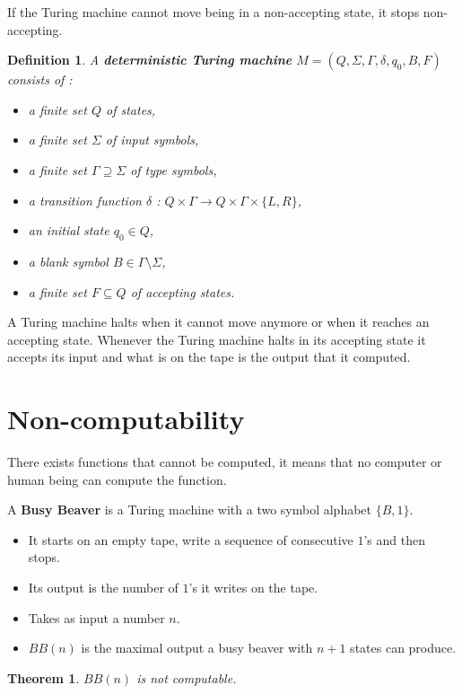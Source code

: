 \documentclass[a4paper,11pt]{report}
\newtheorem*{mydef}{Definition}
\newtheorem{theorem}{Theorem}
\begin{document}
If the Turing machine cannot move being in a non-accepting state,
it stops non-accepting.

\begin{mydef}
  A \textbf{deterministic Turing machine} $M = (Q,\Sigma,\Gamma,\delta,q_0,B,F)$ consists
  of :
  \begin{itemize}
  \item a finite set $Q$ of states,
  \item a finite set $\Sigma$ of input symbols,
  \item a finite set $\Gamma \supseteq \Sigma$ of type symbols,
  \item a transition function $\delta$ : $Q \times \Gamma \rightarrow Q \times
    \Gamma \times \{L,R\}$,
  \item an initial state $q_0 \in Q$,
  \item a blank symbol $B \in \Gamma \setminus \Sigma$,
  \item a finite set $F \subseteq Q$ of accepting states.
  \end{itemize}
\end{mydef}

A Turing machine halts when it cannot move anymore or when it reaches an
accepting state. Whenever the Turing machine halts in its accepting state it
accepts its input and what is on the tape is the output that it computed.

\section{Non-computability}

There exists functions that cannot be computed, it means that no computer or
human being can compute the function.

A \textbf{Busy Beaver} is a Turing machine with a two symbol alphabet $\{B,1\}$.
\begin{itemize}
\item It starts on an empty tape, write a sequence of consecutive $1$'s and then stops.
\item Its output is the number of $1$'s it writes on the tape.
\item Takes as input a number $n$.
\item $BB(n)$ is the maximal output a busy beaver with $n+1$ states can produce.
\end{itemize}

\begin{theorem}
  $BB(n)$ is not computable.
\end{theorem}
\end{document}
